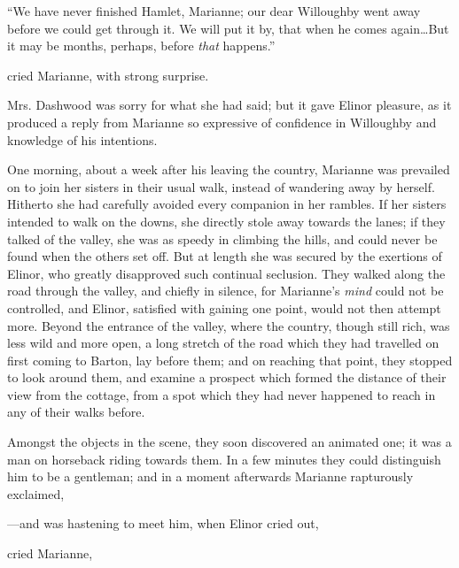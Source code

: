 “We have never finished Hamlet, Marianne; our dear Willoughby went away before we could get through it. We will put it by, that when he comes again\ldots{}But it may be months, perhaps, before {\em that} happens.”

 cried Marianne, with strong surprise. 

Mrs. Dashwood was sorry for what she had said; but it gave Elinor pleasure, as it produced a reply from Marianne so expressive of confidence in Willoughby and knowledge of his intentions.

One morning, about a week after his leaving the country, Marianne was prevailed on to join her sisters in their usual walk, instead of wandering away by herself. Hitherto she had carefully avoided every companion in her rambles. If her sisters intended to walk on the downs, she directly stole away towards the lanes; if they talked of the valley, she was as speedy in climbing the hills, and could never be found when the others set off. But at length she was secured by the exertions of Elinor, who greatly disapproved such continual seclusion. They walked along the road through the valley, and chiefly in silence, for Marianne's {\em mind} could not be controlled, and Elinor, satisfied with gaining one point, would not then attempt more. Beyond the entrance of the valley, where the country, though still rich, was less wild and more open, a long stretch of the road which they had travelled on first coming to Barton, lay before them; and on reaching that point, they stopped to look around them, and examine a prospect which formed the distance of their view from the cottage, from a spot which they had never happened to reach in any of their walks before.

Amongst the objects in the scene, they soon discovered an animated one; it was a man on horseback riding towards them. In a few minutes they could distinguish him to be a gentleman; and in a moment afterwards Marianne rapturously exclaimed,

---and was hastening to meet him, when Elinor cried out,


 cried Marianne, 

